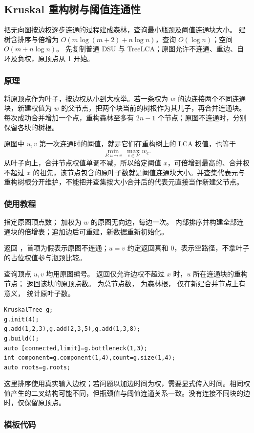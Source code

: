 \subsection{Kruskal 重构树与阈值连通性}
\label{tree:kruskal-tree}
\AlgorithmInfo
    {把无向图按边权逐步连通的过程建成森林，查询最小瓶颈及阈值连通块大小。}
    {建树含排序与倍增为 $O(m\log(m+2)+n\log n)$，查询 $O(\log n)$；空间 $O(m+n\log n)$。}
    {先复制普通 DSU 与 TreeLCA；原图允许不连通、重边、自环及负权，原顶点从 1 开始。}
\subsubsection*{原理}
将原顶点作为叶子，按边权从小到大枚举。若一条权为 $w$ 的边连接两个不同连通块，新建权值为 $w$ 的父节点，把两个块当前的树根作为其儿子，再合并连通块。每次成功合并增加一个点，重构森林至多有 $2n-1$ 个节点；原图不连通时，分别保留各块的树根。

原图中 $u,v$ 第一次连通时的阈值，就是它们在重构树上的 LCA 权值，也等于
\[
    \min_{P:u\leadsto v}\ \max_{e\in P}w_e.
\]
从叶子向上，合并节点权值单调不减，所以给定阈值 $x$，可倍增到最高的、合并权不超过 $x$ 的祖先，该节点包含的原叶子数就是阈值连通块大小。并查集代表元与重构树根分开维护，不能把并查集按大小合并后的代表元直接当作新建父节点。
\subsubsection*{使用教程}
 指定原图顶点数； 加权为 $w$ 的原图无向边，每边一次。 内部排序并构建全部连通块的倍增表；追加边后可重建，新数据重新初始化。

 返回 ，首项为假表示原图不连通；$u=v$ 约定返回真和 0，表示空路径，不拿叶子的占位权值参与瓶颈比较。

查询顶点 $u,v$ 均用原图编号。 返回仅允许边权不超过 $x$ 时，$u$ 所在连通块的重构节点； 返回该块的原顶点数。 为总节点数， 为森林根， 仅在新建合并节点上有意义， 统计原叶子数。
\begin{lstlisting}[style=mtycpp,numbers=none]
KruskalTree g;
g.init(4);
g.add(1,2,3),g.add(2,3,5),g.add(1,3,8);
g.build();
auto [connected,limit]=g.bottleneck(1,3);
int component=g.component(1,4),count=g.size(1,4);
auto roots=g.roots;
\end{lstlisting}
这里排序使用真实输入边权；若问题以加边时间为权，需要显式传入时间。相同权值产生的二叉结构可能不同，但瓶颈值与阈值连通关系一致。没有连接不同块的边时，仅保留原顶点。
\subsubsection*{模板代码}
